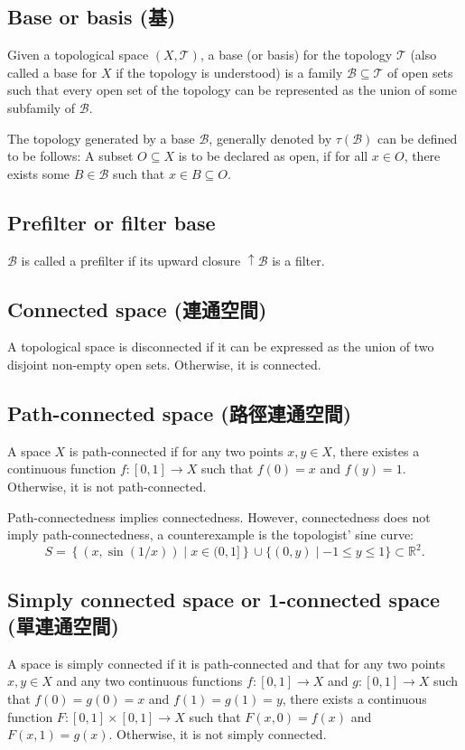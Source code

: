 \documentclass[a4paper,12pt]{article}
\begin{document}
\subsection{Base or basis (基)}
Given a topological space $(X,\mathcal{T})$, a base (or basis) for the topology $\mathcal{T}$ (also called a base for $X$ if the topology is understood) is a family $\mathcal{B}\subseteq\mathcal{T}$ of open sets such that every open set of the topology can be represented as the union of some subfamily of $\mathcal{B}$.

The topology generated by a base $\mathcal{B}$, generally denoted by $\tau(\mathcal{B})$ can be defined to be follows: A subset $O\subseteq X$ is to be declared as open, if for all $x\in O$, there exists some $B\in\mathcal{B}$ such that $x\in B\subseteq O$.
\subsection{Prefilter or filter base}
$\mathcal{B}$ is called a prefilter if its upward closure $\uparrow\mathcal{B}$ is a filter.
\subsection{Connected space (連通空間)}
A topological space is disconnected if it can be expressed as the union of two disjoint non-empty open sets. Otherwise, it is connected.
\subsection{Path-connected space (路徑連通空間)}
A space $X$ is path-connected if for any two points $x,y\in X$, there existes a continuous function $f\colon[0,1]\to X$ such that $f(0)=x$ and $f(y)=1$. Otherwise, it is not path-connected.

Path-connectedness implies connectedness. However, connectedness does not imply path-connectedness, a counterexample is the topologist' sine curve:
\[S = \left\{ (x, \sin(1/x)) \mid x \in (0,1] \right\} \cup \{(0,y) \mid -1 \leq y \leq 1\} \subset \mathbb{R}^2.\]
\subsection{Simply connected space or 1-connected space (單連通空間)}
A space is simply connected if it is path-connected and that for any two points $x,y\in X$ and any two continuous functions $f\colon[0,1]\to X$ and $g\colon[0,1]\to X$ such that $f(0)=g(0)=x$ and $f(1)=g(1)=y$, there exists a continuous function $F\colon[0,1]\times[0,1]\to X$ such that $F(x,0)=f(x)$ and $F(x,1)=g(x)$. Otherwise, it is not simply connected.
\end{document}
